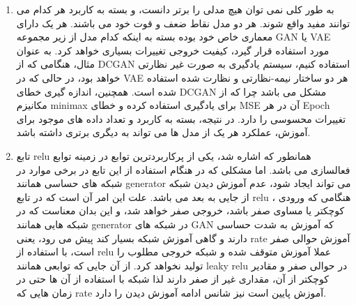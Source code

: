 \begin{enumerate}[label=(\alph*)]
	
	\item
	
	به طور کلی نمی توان هیچ مدلی را برتر دانست، و بسته به کاربرد هر کدام می توانند مفید واقع شوند. هر دو مدل نقاط ضعف و قوت خود می باشند. هر یک دارای معماری خاص خود بوده بسته به اینکه کدام مدل از زیر مجموعه GAN یا VAE مورد استفاده قرار گیرد، کیفیت خروجی تغییرات بسیاری خواهد کرد. به عنوان مثال، هنگامی که از DCGAN استفاده کنیم، سیستم یادگیری به صورت غیر نظارتی خواهد بود، در حالی که در VAE هر دو ساختار نیمه-نظارتی و نظارت شده استفاده شده است. همچنین، اندازه گیری خطای DCGAN مشکل می باشد چرا که از مکانیزم minimax برای یادگیری استفاده کرده و خطای MSE آن در هر Epoch تغییرات محسوسی را دارد. در نتیجه، بسته به کاربرد و تعداد داده های موجود برای آموزش، عملکرد هر یک از مدل ها می تواند به دیگری برتری داشته باشد.
	
	\item
	
	تابع relu همانطور که اشاره شد، یکی از پرکاربردترین توابع در زمینه توابع فعالسازی می باشد. اما مشکلی که در هنگام استفاده از این تابع در برخی موارد در شبکه های حساسی همانند generator می تواند ایجاد شود، عدم آموزش دیدن شبکه از جایی به بعد می باشد. علت این امر آن است که در تابع relu ، هنگامی که ورودی کوچکتر یا مساوی صفر باشد، خروجی صفر خواهد شد، و این بدان معناست که در شبکه هایی همانند generator در شبکه های GAN که آموزش به شدت حساسی دارند و گاهی آموزش شبکه بسیار کند پیش می رود، یعنی rate آموزش حوالی صفر است، با استفاده از relu عملا آموزش متوقف شده و شبکه خروجی مطلوب را تولید نخواهد کرد. از آن جایی که توابعی همانند leaky relu در حوالی صفر و مقادیر کوچکتر از آن، مقداری غیر از صفر دارند لذا شبکه با استفاده از آن ها حتی در زمان هایی که rate آموزش پایین است نیز شانس ادامه آموزش دیدن را دارد.
	
\end{enumerate}